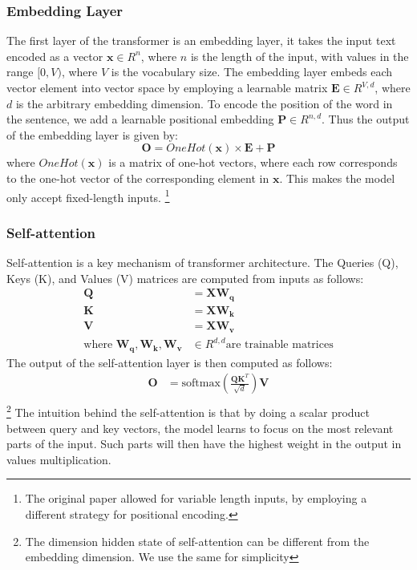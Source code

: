 \subsubsection{Embedding Layer}
The first layer of the transformer is an embedding layer, it takes the input text encoded as a vector $\mathbf{x} \in R^{n}$,
where $n$ is the length of the input, with values in the range $[0, V)$, where $V$ is the vocabulary size.
The embedding layer embeds each vector element into vector space by employing a learnable matrix $\mathbf{E} \in R^{V, d}$, where $d$ is the arbitrary embedding dimension.
To encode the position of the word in the sentence, we add a learnable positional embedding $\mathbf{P} \in R^{n, d}$.
Thus the output of the embedding layer is given by:
\begin{equation}
    \mathbf{O} = OneHot(\mathbf{x}) \times \mathbf{E} + \mathbf{P}
\end{equation}
where $OneHot(\mathbf{x})$ is a matrix of one-hot vectors, where each row corresponds to the one-hot vector of the corresponding element in $\mathbf{x}$.
This makes the model only accept fixed-length inputs.
\footnote{The original paper allowed for variable length inputs, by employing a different strategy for positional encoding.}

\subsubsection{Self-attention}
Self-attention is a key mechanism of transformer architecture.
The Queries (Q), Keys (K), and Values (V) matrices are computed from inputs as follows:
\begin{align}
    \mathbf{Q} &= \mathbf{X} \mathbf{W_q} \\
    \mathbf{K} &= \mathbf{X} \mathbf{W_k} \\
    \mathbf{V} &= \mathbf{X} \mathbf{W_v} \\
    \text{where } \mathbf{W_q}, \mathbf{W_k}, \mathbf{W_v} &\in R^{d, d} \text{are trainable matrices}
\end{align}
The output of the self-attention layer is then computed as follows:
\begin{align}
    \mathbf{O} &= \text{softmax}(\frac{\mathbf{Q} \mathbf{K}^T}{\sqrt{d}}) \mathbf{V} \\
    \label{eq:attention}
\end{align}
\footnote{The dimension hidden state of self-attention can be different from the embedding dimension. We use the same for simplicity}
The intuition behind the self-attention is that by doing a scalar product between query and key vectors,
the model learns to focus on the most relevant parts of the input.
Such parts will then have the highest weight in the output in values multiplication.

